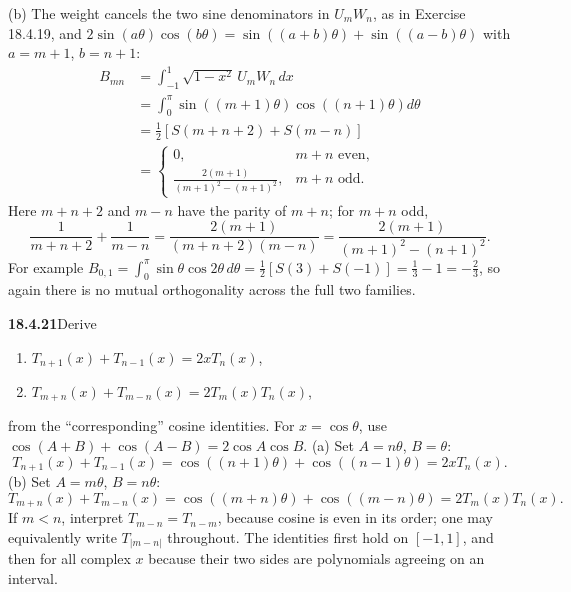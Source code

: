 (b) The weight cancels the two sine denominators in $U_mW_n$, as in
Exercise 18.4.19, and
$2\sin(a\theta)\cos(b\theta)=\sin((a+b)\theta)+\sin((a-b)\theta)$
with $a=m+1$, $b=n+1$:
\begin{align*}
B_{mn}&=\int_{-1}^1\sqrt{1-x^2}\,U_mW_n\,dx\\
 &=\int_0^\pi\sin((m+1)\theta)\cos((n+1)\theta)d\theta\\
 &=\tfrac12[S(m+n+2)+S(m-n)]\\
 &=\boxed{\begin{cases}
 0,&m+n\text{ even},\\[2pt]
 \displaystyle\frac{2(m+1)}{(m+1)^2-(n+1)^2},&m+n\text{ odd}.
 \end{cases}}
\end{align*}
Here $m+n+2$ and $m-n$ have the parity of $m+n$; for $m+n$ odd,
\[
\frac1{m+n+2}+\frac1{m-n}=\frac{2(m+1)}{(m+n+2)(m-n)}
 =\frac{2(m+1)}{(m+1)^2-(n+1)^2}.
\]
For example
$B_{0,1}=\int_0^\pi\sin\theta\cos2\theta\,d\theta
=\frac12[S(3)+S(-1)]=\frac13-1=-\frac23$, so again there is no mutual
orthogonality across the full two families.

\par\bigskip
\noindent\textbf{18.4.21}\quad Derive
\begin{enumerate}
\item[(a)] $T_{n+1}(x)+T_{n-1}(x)=2xT_{n}(x)$,
\item[(b)] $T_{m+n}(x)+T_{m-n}(x)=2T_{m}(x)T_{n}(x)$,
\end{enumerate}
from the ``corresponding'' cosine identities.
\solution
For $x=\cos\theta$, use
$\cos(A+B)+\cos(A-B)=2\cos A\cos B$.
(a) Set $A=n\theta$, $B=\theta$:
\[
T_{n+1}(x)+T_{n-1}(x)
 =\cos((n+1)\theta)+\cos((n-1)\theta)
 =\boxed{2xT_n(x)}.
\]
(b) Set $A=m\theta$, $B=n\theta$:
\[
T_{m+n}(x)+T_{m-n}(x)
 =\cos((m+n)\theta)+\cos((m-n)\theta)
 =\boxed{2T_m(x)T_n(x)}.
\]
If $m<n$, interpret $T_{m-n}=T_{n-m}$, because cosine is even
in its order; one may equivalently write $T_{|m-n|}$ throughout.
The identities first hold on $[-1,1]$, and then for all complex
$x$ because their two sides are polynomials agreeing on an interval.

